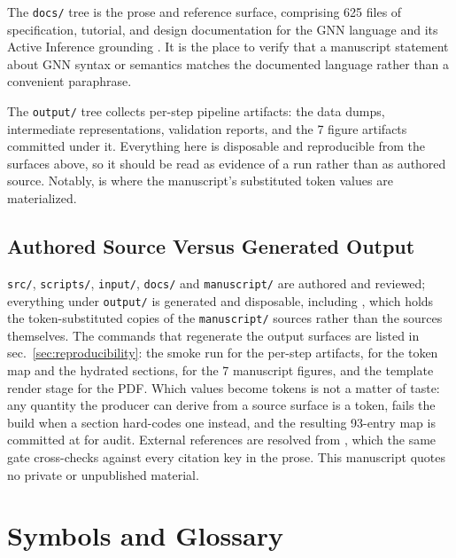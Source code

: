 \documentclass[
  english,
  9pt,
]{extarticle}
\begin{document}
The \texttt{docs/} tree is the prose and reference surface, comprising
625 files of specification, tutorial, and design documentation for the
GNN language and its Active Inference grounding \citep{gnn2023}. It is
the place to verify that a manuscript statement about GNN syntax or
semantics matches the documented language rather than a convenient
paraphrase.

The \texttt{output/} tree collects per-step pipeline artifacts: the data
dumps, intermediate representations, validation reports, and the 7
figure artifacts committed under it. Everything here is disposable and
reproducible from the surfaces above, so it should be read as evidence
of a run rather than as authored source. Notably,
 is where the
manuscript's substituted token values are materialized.

\subsection{Authored Source Versus Generated
Output}\label{authored-source-versus-generated-output}

\texttt{src/}, \texttt{scripts/}, \texttt{input/}, \texttt{docs/} and
\texttt{manuscript/} are authored and reviewed; everything under
\texttt{output/} is generated and disposable, including
, which holds the token-substituted copies of
the \texttt{manuscript/} sources rather than the sources themselves. The
commands that regenerate the output surfaces are listed in
sec.~\ref{sec:reproducibility}: the smoke run for the per-step
artifacts,  for
the token map and the hydrated sections,
 for the 7 manuscript
figures, and the template render stage for the PDF. Which values become
tokens is not a matter of taste: any quantity the producer can derive
from a source surface is a token,
 fails the build when a
section hard-codes one instead, and the resulting 93-entry map is
committed at  for audit.
External references are resolved from
, which the same gate cross-checks
against every citation key in the prose. This manuscript quotes no
private or unpublished material.

\newpage

\section{Symbols and Glossary}\label{sec:symbols_glossary}
\end{document}
